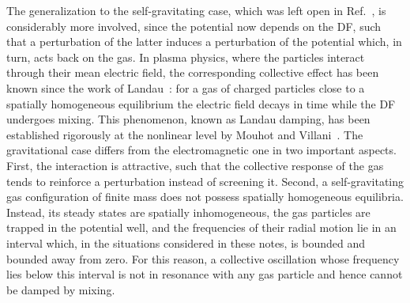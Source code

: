 The generalization to the self-gravitating case, which was left open in Ref.~\cite{pRoS20}, is considerably more involved, since the potential now depends on the DF, such that a perturbation of the latter induces a perturbation of the potential which, in turn, acts back on the gas. In plasma physics, where the particles interact through their mean electric field, the corresponding collective effect has been known since the work of Landau~\cite{lL46}: for a gas of charged particles close to a spatially homogeneous equilibrium the electric field decays in time while the DF undergoes mixing. This phenomenon, known as Landau damping, has been established rigorously at the nonlinear level by Mouhot and Villani~\cite{cMcV11}. The gravitational case differs from the electromagnetic one in two important aspects. First, the interaction is attractive, such that the collective response of the gas tends to reinforce a perturbation instead of screening it. Second, a self-gravitating gas configuration of finite mass does not possess spatially homogeneous equilibria. Instead, its steady states are spatially inhomogeneous, the gas particles are trapped in the potential well, and the frequencies of their radial motion lie in an interval which, in the situations considered in these notes, is bounded and bounded away from zero. For this reason, a collective oscillation whose frequency lies below this interval is not in resonance with any gas particle and hence cannot be damped by mixing.

